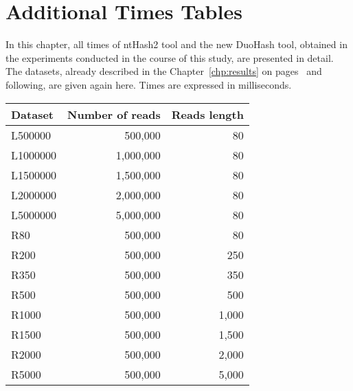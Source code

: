 \chapter{Additional Times Tables}
\label{chp:additional-time-tables}


In this chapter, all times of ntHash2 tool and the new DuoHash tool, obtained in the experiments conducted in the course of this study, are presented in detail. The datasets, already described in the Chapter~\ref{chp:results} on pages~\pageref{subsec:dataset} and following, are given again here. Times are expressed in milliseconds.

\begin{table}[!ht]
	\centering
	\begin{tabular}{l r r}
		\textbf{Dataset} & \textbf{Number of reads} & \textbf{Reads length} \\
		\toprule
		L500000 & 500,000 & 80 \\
		L1000000 & 1,000,000 & 80 \\
		L1500000 & 1,500,000 & 80 \\
		L2000000 & 2,000,000 & 80 \\
		L5000000 & 5,000,000 & 80 \\
		\midrule
		R80 & 500,000 & 80 \\
		R200 & 500,000 & 250 \\
		R350 & 500,000 & 350 \\
		R500 & 500,000 & 500 \\
		R1000 & 500,000 & 1,000 \\
		R1500 & 500,000 & 1,500 \\
		R2000 & 500,000 & 2,000 \\
		R5000 & 500,000 & 5,000 \\
		\bottomrule
	\end{tabular}
\end{table}
\clearpage




